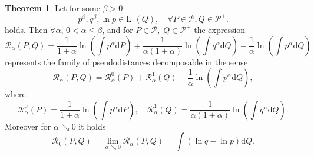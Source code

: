 \documentclass[11pt,a4paper]{article}
\theoremstyle{definition}
\theoremstyle{theorem}
\newtheorem{theorem}{Theorem}[section]
\begin{document}
\begin{theorem}
Let for some $\beta>0$
	\begin{equation*}
			p^\beta, q^\beta,\ln{p} \in \mathrm{L}_1(Q), \quad \forall P \in \mathcal{P}, Q \in \mathcal{P^+}.
	\end{equation*}
	holds. Then $\forall \alpha$, $0 < \alpha \leq \beta$, and for $P \in \mathcal{P}, \; Q \in \mathcal{P^+} $ the expression 
	\begin{equation}
		\mathcal{R}_\alpha (P,Q) = \dfrac{1}{1+\alpha}\ln{\left( \int{p^\alpha \mathrm{d}P } \right)} +
		\dfrac{1}{\alpha (1+\alpha)}\ln{\left( \int{q^\alpha \mathrm{d}Q } \right)} -
		\dfrac{1}{\alpha} \ln{\left( \int{p^\alpha \mathrm{d}Q } \right)}
	\end{equation}
		represents the family of pseudodistances decomposable in the sense
	\begin{equation*}
		\mathcal{R}_\alpha (P,Q) = \mathcal{R}_\alpha^0 (P) + \mathcal{R}_\alpha^1 (Q) - \dfrac{1}{\alpha} \ln{\left( \int{p^\alpha \mathrm{d}Q } \right)},
	\end{equation*}	
	where 
	\begin{equation*}
		\mathcal{R}_\alpha^0 (P) = \dfrac{1}{1+\alpha}\ln{\left( \int{p^\alpha \mathrm{d}P } \right)}, \quad \mathcal{R}_\alpha^1 (Q) = \dfrac{1}{\alpha (1+\alpha)}\ln{\left( \int{q^\alpha \mathrm{d}Q } \right)}.
	\end{equation*}
	Moreover for $\alpha \searrow 0$ it holds
	\begin{equation*}
		\mathcal{R}_0 (P,Q) = \lim_{\alpha \searrow 0} \mathcal{R}_\alpha (P,Q) =  \int{\left( \ln{q} - \ln{p} \right)\mathrm{d}Q}.
	\end{equation*}
\end{theorem}






\pagebreak
\end{document}
